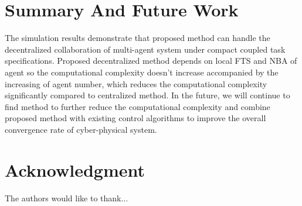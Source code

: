 \documentclass[journal]{IEEEtran}
\begin{document}
\section{Summary And Future Work}

The simulation results demonstrate that proposed method can handle the decentralized collaboration of multi-agent system under compact coupled task specifications. Proposed decentralized method depends on local FTS and NBA of agent so the computational complexity doesn't increase accompanied by the increasing of agent number, which reduces the computational complexity significantly compared to centralized method. In the future, we will continue to find method to further reduce the computational complexity and combine proposed method with existing control algorithms to improve the overall convergence rate of cyber-physical system.


\section*{Acknowledgment}


The authors would like to thank...


\ifCLASSOPTIONcaptionsoff
  \newpage
\fi




\end{document}
